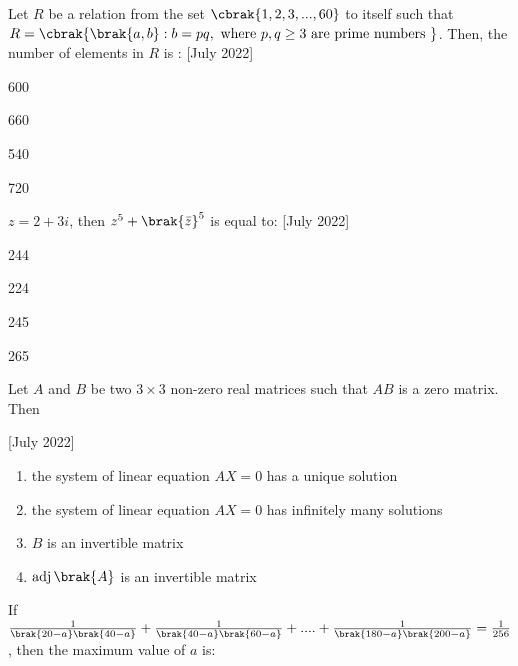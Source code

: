  \iffalse
  \title{2022}
  \author{EE24BTECH11010}
  \section{mcq-single}
\fi
 \item Let $R$ be a relation from the set $\cbrak{1,2,3,...,60}$
 to itself such that $R = \cbrak{\brak{a,b} : b = pq, \text{ where } p, q \ge 3 \text{ are prime numbers }}$. Then, the  number of elements in $R$ is : \hfill [July 2022]
 \begin{enumerate}
     \begin{multicols}{2}
         \item 600
         \item 660
         \item 540
         \item 720
     \end{multicols}
 \end{enumerate}
 \item $z = 2 + 3i$, then $z^5 + \brak{\bar{z}}^5$ is equal to: \hfill [July 2022]
 \begin{enumerate}
     \begin{multicols}{2}
         \item 244
         \item 224
         \item 245
         \item 265
     \end{multicols}
 \end{enumerate}
 \item Let $A$ and $B$ be two $3 \times 3$
 non-zero real matrices such that $AB$ is a zero matrix. Then

 \hfill[July 2022]
 \begin{enumerate}
     
         \item the system of linear equation $AX = 0$ has a unique solution
         \item the system of linear equation $AX = 0$ has infinitely many solutions
         \item $B$ is an invertible matrix
	 \item $\operatorname{adj} \brak{A}$ is an invertible matrix 
 \end{enumerate}
 \item If $\frac{1}{\brak{20-a}\brak{40-a}} + \frac{1}{\brak{40-a}\brak{60-a}} + . . . . + \frac{1}{\brak{180-a}\brak{200-a}} = \frac{1}{256}$, then the maximum value of $a$ is:

